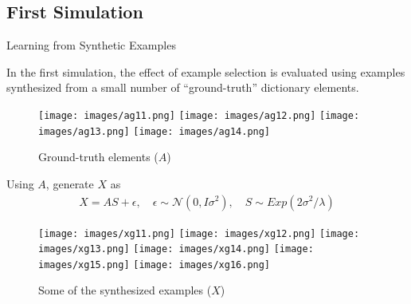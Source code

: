 \documentclass{beamer}
\begin{document}
\subsection{First Simulation}
\begin{frame}{Learning from Synthetic Examples}

In the first simulation, the effect of example selection is evaluated using examples synthesized from a small number of ``ground-truth'' dictionary elements.
\begin{figure}
  \centering
  \texttt{[image: images/ag11.png]} \hspace{1mm}
  \texttt{[image: images/ag12.png]} \hspace{1mm}
  \texttt{[image: images/ag13.png]} \hspace{1mm}
  \texttt{[image: images/ag14.png]} 
  \caption{Ground-truth elements ($A$)}
\end{figure}
\vspace{-.3cm}

Using $A$, generate $X$ as
\vspace{-.3cm}
\begin{align*}
X = A S + \epsilon, \quad \epsilon \sim \mathcal{N}(0, I \sigma^2), \quad S \sim Exp(2 \sigma^2 / \lambda)
\end{align*}

\begin{figure}
  \centering
  \texttt{[image: images/xg11.png]} \hspace{1mm}
  \texttt{[image: images/xg12.png]} \hspace{1mm}
  \texttt{[image: images/xg13.png]} \hspace{1mm}
  \texttt{[image: images/xg14.png]} \hspace{1mm}
  \texttt{[image: images/xg15.png]} \hspace{1mm}
  \texttt{[image: images/xg16.png]} \hspace{1mm}
  \caption{Some of the synthesized examples ($X$)}
\end{figure}

\end{frame}
\end{document}
